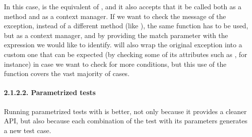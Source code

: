 \documentclass[a4paper,10pt,english]{sphinxmanual}
\begin{document}
\begin{sphinxVerbatim}[commandchars=\\\{\}]
 
      
      

 
      
      
      
\end{sphinxVerbatim}

In this case,  is the equivalent of ,
and it also accepts that it be called both as a method and as a context manager. If we want
to check the message of the exception, instead of a different method
(like ), the same function has to be used, but as a context manager,
and by providing the match parameter with the expression we would like to identify.
 will also wrap the original exception into a custom one that can be expected (by
checking some of its attributes such as , for instance) in case we want to check for
more conditions, but this use of the function covers the vast majority of cases.


\paragraph{2.1.2.2. Parametrized tests}
\label{\detokenize{chapters/8_unit_testing/index:parametrized-tests}}
Running parametrized tests with  is better, not only because it provides a cleaner
API, but also because each combination of the test with its parameters generates a new test
case.
\end{document}
